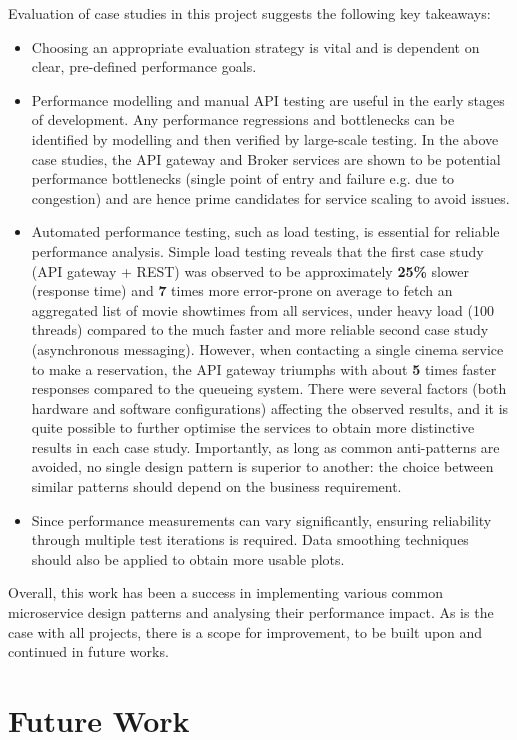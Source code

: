 Evaluation of case studies in this project suggests the following key takeaways:
\begin{itemize}
  \item Choosing an appropriate evaluation strategy is vital and is dependent on clear, pre-defined performance goals.
  \item Performance modelling and manual API testing are useful in the early stages of development. Any performance regressions and bottlenecks can be identified by modelling and then verified by large-scale testing. In the above case studies, the API gateway and Broker services are shown to be potential performance bottlenecks (single point of entry and failure e.g. due to congestion) and are hence prime candidates for service scaling to avoid issues.
  \item Automated performance testing, such as load testing, is essential for reliable performance analysis. Simple load testing reveals that the first case study (API gateway + REST) was observed to be approximately \textbf{25\%} slower (response time) and \textbf{7} times more error-prone on average to fetch an aggregated list of movie showtimes from all services,  under heavy load (100 threads) compared to the much faster and more reliable second case study (asynchronous messaging). However, when contacting a single cinema service to make a reservation, the API gateway triumphs with about \textbf{5} times faster responses compared to the queueing system. There were several factors (both hardware and software configurations) affecting the observed results, and it is quite possible to further optimise the services to obtain more distinctive results in each case study. Importantly, as long as common anti-patterns are avoided, no single design pattern is superior to another: the choice between similar patterns should depend on the business requirement.
  \item Since performance measurements can vary significantly, ensuring reliability through multiple test iterations is required. Data smoothing techniques should also be applied to obtain more usable plots.
\end{itemize}

Overall, this work has been a success in implementing various common microservice design patterns and analysing their performance impact. As is the case with all projects, there is  a scope for improvement, to be built upon and continued in future works.

\section{Future Work}

